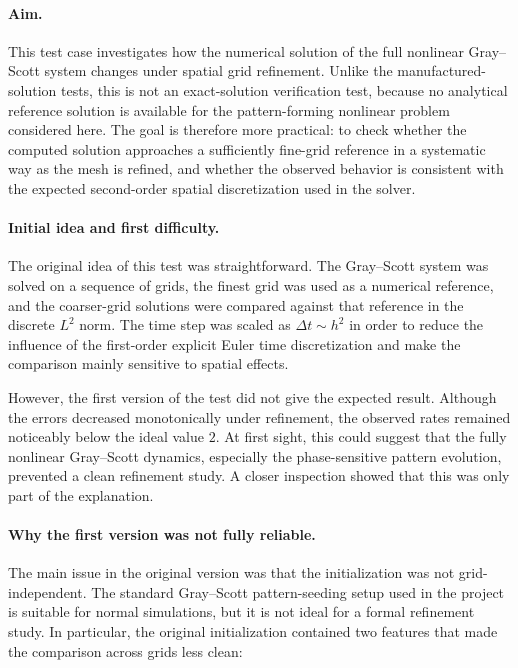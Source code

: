 \paragraph{Aim.}
This test case investigates how the numerical solution of the full nonlinear Gray--Scott system changes under spatial grid refinement. Unlike the manufactured-solution tests, this is not an exact-solution verification test, because no analytical reference solution is available for the pattern-forming nonlinear problem considered here. The goal is therefore more practical: to check whether the computed solution approaches a sufficiently fine-grid reference in a systematic way as the mesh is refined, and whether the observed behavior is consistent with the expected second-order spatial discretization used in the solver.

\paragraph{Initial idea and first difficulty.}
The original idea of this test was straightforward. The Gray--Scott system was solved on a sequence of grids, the finest grid was used as a numerical reference, and the coarser-grid solutions were compared against that reference in the discrete \(L^2\) norm. The time step was scaled as \(\Delta t \sim h^2\) in order to reduce the influence of the first-order explicit Euler time discretization and make the comparison mainly sensitive to spatial effects.

However, the first version of the test did not give the expected result. Although the errors decreased monotonically under refinement, the observed rates remained noticeably below the ideal value \(2\). At first sight, this could suggest that the fully nonlinear Gray--Scott dynamics, especially the phase-sensitive pattern evolution, prevented a clean refinement study. A closer inspection showed that this was only part of the explanation.

\paragraph{Why the first version was not fully reliable.}
The main issue in the original version was that the initialization was not grid-independent. The standard Gray--Scott pattern-seeding setup used in the project is suitable for normal simulations, but it is not ideal for a formal refinement study. In particular, the original initialization contained two features that made the comparison across grids less clean:

